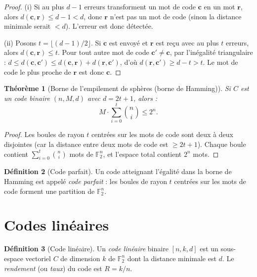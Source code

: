 \documentclass[12pt,a4paper,openany]{book}
\theoremstyle{definition}
\newtheorem{definition}{Définition}[chapter]
\theoremstyle{plain}
\newtheorem{theoreme}[definition]{Théorème}
\theoremstyle{remark}
\begin{document}
\begin{proof}
(i) Si au plus $d-1$ erreurs transforment un mot de code $\mathbf{c}$ en
un mot $\mathbf{r}$, alors $d(\mathbf{c}, \mathbf{r}) \leq d-1 < d$,
donc $\mathbf{r}$ n'est pas un mot de code (sinon la distance minimale
serait $< d$). L'erreur est donc détectée.

(ii) Posons $t = \lfloor (d-1)/2 \rfloor$. Si $\mathbf{c}$ est envoyé
et $\mathbf{r}$ est reçu avec au plus $t$ erreurs, alors
$d(\mathbf{c}, \mathbf{r}) \leq t$. Pour tout autre mot de code
$\mathbf{c'} \neq \mathbf{c}$, par l'inégalité triangulaire :
$d \leq d(\mathbf{c}, \mathbf{c'}) \leq d(\mathbf{c}, \mathbf{r}) +
d(\mathbf{r}, \mathbf{c'})$, d'où
$d(\mathbf{r}, \mathbf{c'}) \geq d - t > t$. Le mot de code le plus
proche de $\mathbf{r}$ est donc $\mathbf{c}$.
\end{proof}

\begin{theoreme}[Borne de l'empilement de sphères (borne de Hamming)]
\label{thm:hamming-bound}
Si $C$ est un code binaire $(n, M, d)$ avec $d = 2t+1$, alors :
\[
  M \cdot \sum_{i=0}^{t} \binom{n}{i} \leq 2^n.
\]
\end{theoreme}

\begin{proof}
Les boules de rayon $t$ centrées sur les mots de code sont deux à deux
disjointes (car la distance entre deux mots de code est $\geq 2t+1$).
Chaque boule contient $\sum_{i=0}^t \binom{n}{i}$ mots de
$\mathbb{F}_2^n$, et l'espace total contient $2^n$ mots.
\end{proof}

\begin{definition}[Code parfait]
\label{def:code-parfait}
Un code atteignant l'égalité dans la borne de Hamming est appelé
\emph{code parfait} : les boules de rayon $t$ centrées sur les mots de
code forment une partition de $\mathbb{F}_2^n$.
\end{definition}

\section{Codes linéaires}
\label{sec:codes-lineaires}

\begin{definition}[Code linéaire]
\label{def:code-lineaire}
Un \emph{code linéaire} binaire $[n, k, d]$ est un sous-espace vectoriel
$C$ de dimension $k$ de $\mathbb{F}_2^n$ dont la distance minimale est
$d$. Le \emph{rendement} (ou \emph{taux}) du code est $R = k/n$.
\end{definition}
\end{document}
